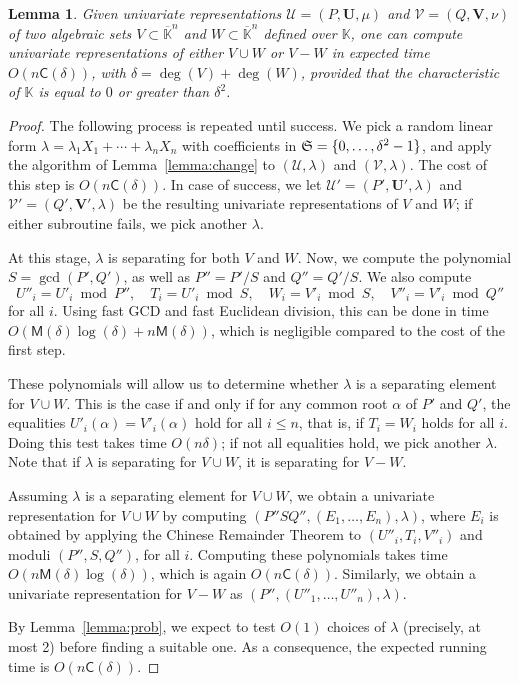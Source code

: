 \documentclass[12pt]{article}
\def\CC {\ensuremath{\mathsf{C}}}
\def\K {\ensuremath{\mathbb{K}}}
\def\Kbar {\ensuremath{\overline{\mathbb{K}}}}
\def\M {\ensuremath{\mathsf{M}}}
\def\Uu {\ensuremath{\mathbf{U}}}
\def\Vv {\ensuremath{\mathbf{V}}}
\def\Ur {\ensuremath{\mathscr U}}
\def\Vr {\ensuremath{\mathscr V}}
\newtheorem{Lemma}{Lemma}
\begin{document}
\begin{Lemma}\label{lemma:merge}
  Given univariate representations $\Ur=(P,\Uu,\mu)$ and
  $\Vr=(Q,\Vv,\nu)$ of two algebraic sets $V \subset\Kbar^n$ and $W
  \subset\Kbar^n$ defined over $\K$, one can compute univariate
  representations of either $V \cup W$ or $V-W$ in expected time $O(n
  \CC(\delta))$, with $\delta=\deg(V)+\deg(W)$, provided that the
  characteristic of $\K$ is equal to $0$ or greater than $\delta^2$.
\end{Lemma}
\begin{proof}
  The following process is repeated until success. We pick a random
  linear form $\lambda=\lambda_1 X_1 + \cdots + \lambda_n X_n$ with
  coefficients in ${\frak S}=\{0,\dots,\delta^2-1\}$, and apply the
  algorithm of Lemma~\ref{lemma:change} to $(\Ur,\lambda)$ and
  $(\Vr,\lambda)$.  The cost of this step is $O(n\CC(\delta))$. In
  case of success, we let $\Ur'=(P',\Uu',\lambda)$ and
  $\Vr'=(Q',\Vv',\lambda)$ be the resulting univariate representations
  of $V$ and $W$; if either subroutine fails, we pick another
  $\lambda$.

  At this stage, $\lambda$ is separating for both $V$ and $W$.  Now,
  we compute the polynomial $S=\gcd(P',Q')$, as well as $P''=P'/S$ and
  $Q''=Q'/S$. We also compute
  $$U''_i=U'_i \bmod P'',\quad T_i=U'_i \bmod S,\quad W_i=V'_i \bmod
  S,\quad V''_i=V'_i \bmod Q''$$ for all $i$. Using fast GCD and fast
  Euclidean division, this can be done in time
  $O(\M(\delta)\log(\delta)+n\M(\delta))$, which is negligible
  compared to the cost of the first step.

  These polynomials will allow us to determine whether $\lambda$ is a
  separating element for $V \cup W$. This is the case if and only if
  for any common root $\alpha$ of $P'$ and $Q'$, the equalities
  $U'_i(\alpha)=V'_i(\alpha)$ hold for all $i \le n$, that is, if
  $T_i=W_i$ holds for all $i$. Doing this test takes time
  $O(n\delta)$; if not all equalities hold, we pick another $\lambda$.
  Note that if $\lambda$ is separating for $V \cup W$, it is
  separating for $V- W$.

  Assuming $\lambda$ is a separating element for $V\cup W$, we obtain
  a univariate representation for $V\cup W$ by computing $(P''S
  Q'',(E_1,\dots,E_n),\lambda)$, where $E_i$ is obtained by applying
  the Chinese Remainder Theorem to $(U''_i, T_i, V''_i)$ and moduli
  $(P'',S,Q'')$, for all $i$. Computing these polynomials takes time
  $O(n \M(\delta)\log(\delta))$, which is again
  $O(n\CC(\delta))$. Similarly, we obtain a univariate representation
  for $V - W$ as $(P'',(U''_1,\dots,U''_n),\lambda)$.

  By Lemma~\ref{lemma:prob}, we expect to test $O(1)$ choices of
  $\lambda$ (precisely, at most 2) before finding a suitable one.  As
  a consequence, the expected running time is $O(n\CC(\delta))$.
\end{proof}
\end{document}
